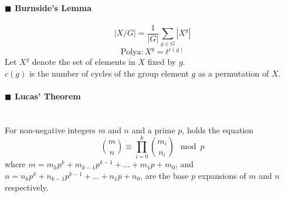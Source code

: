 \documentclass[10pt]{article}
\begin{document}
{\paragraph{$\blacksquare$ Burnside's Lemma}
\noindent
\begin{displaymath}
|X/G|=\frac{1}{|G|}\sum_{g\in G}|X^g|
\end{displaymath}
\begin{displaymath}
\mathrm{Polya}: X^g=t^{c(g)}
\end{displaymath}
Let $X^g$ denote the set of elements in $X$ fixed by $g$. \\
$c(g)$ is the number of cycles of the group element $g$ as a permutation of $X$.
\paragraph{$\blacksquare$ Lucas' Theorem}
\noindent \\
For non-negative integers $m$ and $n$ and a prime $p$, holds the equation \\
\begin{displaymath}
\binom{m}{n} \equiv \prod_{i=0}^k \binom{m_i}{n_i} \mod p
\end{displaymath}
where $m=m_kp^k+m_{k-1}p^{k-1}+\ldots +m_1p+m_0$, and $n=n_kp^k+n_{k-1}p^{k-1}+\ldots +n_1p+n_0$, are the base $p$ expansions of $m$ and $n$ respectively.
}
\end{document}
